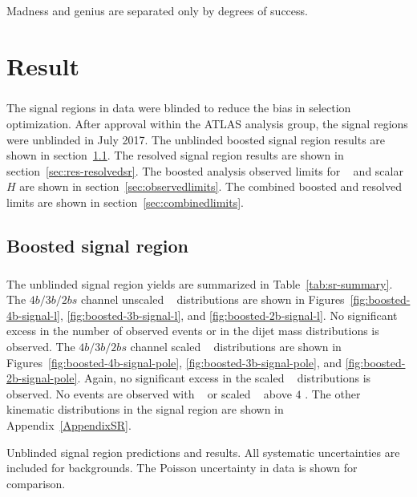 \begin{savequote}[75mm]
Madness and genius are separated only by degrees of success. 
\end{savequote}

\chapter{Result}
\paragraph{}
The signal regions in data were blinded to reduce the bias in selection optimization.
After approval within the ATLAS analysis group, the signal regions were unblinded in July 2017.
The unblinded boosted signal region results are shown in section~\ref{sec:res-boostedsr}.
The resolved signal region results are shown in section~\ref{sec:res-resolvedsr}.
The boosted analysis observed limits for \Grav~ and scalar $H$ are shown in section~\ref{sec:observedlimits}.
The combined boosted and resolved limits are shown in section~\ref{sec:combinedlimits}.

\section{Boosted signal region}
\label{sec:res-boostedsr}
\paragraph{}
The unblinded signal region yields are summarized in Table~\ref{tab:sr-summary}. 
The $4b/3b/2bs$ channel unscaled \mtwoJ~ distributions are shown in Figures~\ref{fig:boosted-4b-signal-l}, \ref{fig:boosted-3b-signal-l}, and \ref{fig:boosted-2b-signal-l}. 
No significant excess in the number of observed events or in the dijet mass distributions is observed.
The $4b/3b/2bs$ channel scaled \mtwoJ~ distributions are shown in Figures~\ref{fig:boosted-4b-signal-pole}, \ref{fig:boosted-3b-signal-pole}, and \ref{fig:boosted-2b-signal-pole}. 
Again, no significant excess in the scaled \mtwoJ~ distributions is observed.
No events are observed with \mtwoJ~ or scaled \mtwoJ~ above $4$ \TeV.
The other kinematic distributions in the signal region are shown in Appendix~\ref{AppendixSR}.

\begin{table}[htb!]
\scriptsize
\begin{center}
\caption{Unblinded signal region predictions and results. All systematic uncertainties are included for backgrounds. The Poisson uncertainty in data is shown for comparison.}

\label{tab:sr-summary}
\end{center}
\end{table}


